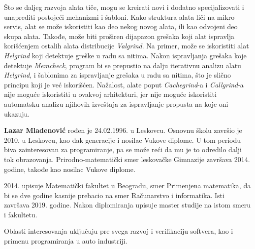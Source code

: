\documentclass[12pt,oneside]{memoir}
\theoremstyle{plain}
\theoremstyle{definition}
\begin{document}
Što se daljeg razvoja alata tiče, mogu se kreirati novi i dodatno specijalizovati i unaprediti postojeći mehanizmi i šabloni. Kako struktura alata liči na mikro servis, alat se može iskoristiti kao deo nekog novog alata, ili kao odvojeni deo skupa alata. Takođe, može biti proširen dijapazon grešaka koji alat ispravlja korišćenjem ostalih alata distribucije \textit{Valgrind}. Na primer, može se iskoristiti alat \textit{Helgrind} koji detektuje greške u radu sa nitima. Nakon ispravljanja grešaka koje detektuje \textit{Memcheck}, program bi se prepustio na dalju iterativnu analizu alatu \textit{Helgrind}, i šablonima za ispravljanje grešaka u radu sa nitima, što je slično principu koji je već iskorišćen. Nažalost, alate poput \textit{Cachegrind}-a i \textit{Callgrind}-a nije moguće iskoristiti u ovakvoj arhitekturi, jer nije moguće iskoristiti automatsku analizu njihovih izveštaja za ispravljanje propusta na koje oni ukazuju.


\literatura

\backmatter

\begin{biografija}
  \textbf{Lazar Mladenović} rođen je 24.02.1996. u Leskovcu. Osnovnu školu završio je 2010. u Leskovcu, kao đak generacije i nosilac Vukove diplome. U tom periodu biva zainteresovan za programiranje, pa se može reći da mu je to odredilo dalji tok obrazovanja. Prirodno-matematički smer leskovačke Gimnazije završava 2014. godine, takođe kao nosilac Vukove diplome.
  
  2014. upisuje Matematički fakultet u Beogradu, smer Primenjena matematika, da bi se  dve godine kasnije prebacio na smer Računarstvo i informatika. Isti završava 2019. godine. Nakon diplomiranja upisuje master studije na istom smeru i fakultetu. 
  
  Oblasti interesovanja uključuju pre svega razvoj i verifikaciju softvera, kao i primenu programiranja u auto industriji.  
    
\end{biografija}
\end{document}
